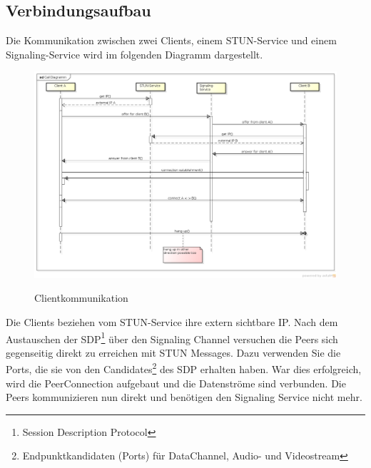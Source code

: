 	\subsection{Verbindungsaufbau}
		Die Kommunikation zwischen zwei Clients, einem STUN-Service und einem
		Signaling-Service wird im folgenden Diagramm dargestellt.
		\begin{figure}[H]
			\centering
			\includegraphics[width=\textwidth]{../architekturanalayse/img/callDiagramm.png}
			\label{img:deployment}
			\caption{Clientkommunikation}
		\end{figure}
		Die Clients beziehen vom STUN-Service ihre extern sichtbare IP. Nach dem Austauschen der SDP\footnote{Session Description Protocol\cite{IETF-SDP-RFC}} über den Signaling Channel versuchen die Peers sich gegenseitig direkt zu erreichen mit STUN Messages. Dazu verwenden Sie die Ports, die sie von den Candidates\footnote{Endpunktkandidaten (Ports) für DataChannel, Audio- und Videostream} des SDP erhalten haben.
		War dies erfolgreich, wird die PeerConnection aufgebaut und die Datenströme sind verbunden. Die Peers kommunizieren nun direkt und benötigen den Signaling Service nicht mehr.
		
